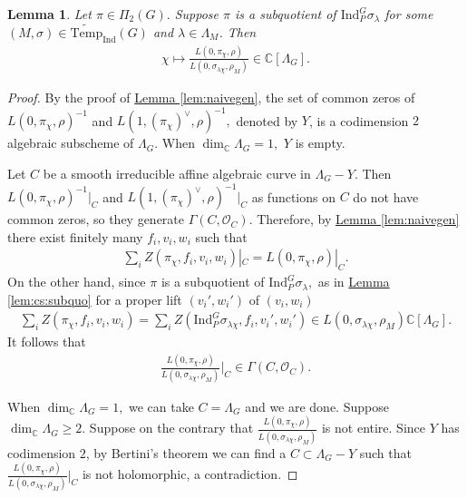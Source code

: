 \documentclass[10pt]{amsart}
\newtheorem{lemma}[theorem]{Lemma}
\theoremstyle{definition}
\numberwithin{equation}{section}
\numberwithin{equation}{subsection}
\newcommand{\Ind}{\mathrm{Ind}}
\newcommand{\CC}{\mathbb{C}}
\newcommand{\Temp}{\mathrm{Temp}}
\begin{document}
\begin{lemma}\label{lem:divides}
    Let $\pi\in \Pi_2(G).$ Suppose $\pi$ is a subquotient of $\mathrm{Ind}_P^G\sigma_\lambda$ for some $(M,\sigma)\in\widetilde{\Temp}_{\Ind}(G)$ and $\lambda\in \Lambda_M$. Then 
    \begin{align*}
        \chi\mapsto \frac{L(0,\pi_\chi,\rho)}{L(0,\sigma_{\lambda\chi},\rho_M)}\in \CC[\Lambda_G].
    \end{align*}
\end{lemma}

\begin{proof}
By the proof of \hyperref[lem:naivegen]{Lemma \ref{lem:naivegen}}, the set of common zeros of $L(0,\pi_\chi,\rho)^{-1}$ and  $L(1,(\pi_{\chi})^\lor,\rho)^{-1},$ denoted by $Y$, is a codimension $2$ algebraic subscheme of $\Lambda_G$. When $\dim_\CC\Lambda_G=1,$ $Y$ is empty. 

    
    Let $C$ be a smooth irreducible affine algebraic curve in $\Lambda_G-Y$. Then $L(0,\pi_{\chi},\rho)^{-1}|_C$ and $L(1,(\pi_{\chi})^\lor,\rho)^{-1}|_C$ as functions on $C$ do not have common zeros, so they generate $\Gamma(C,\mathcal{O}_C).$ Therefore, by \hyperref[lem:naivegen]{Lemma \ref{lem:naivegen}} there exist finitely many $f_i,v_i,w_i$ such that
    \begin{align*}
\sum_{i}Z(\pi_{\chi},f_i,v_i,w_i)|_C=L(0,\pi_{\chi},\rho)|_C.
    \end{align*}
    On the other hand, since $\pi$ is a subquotient of $\mathrm{Ind}_P^G\sigma_\lambda,$ as in \hyperref[lem:cs:subquo]{Lemma \ref{lem:cs:subquo}} for a proper lift $(v_i',w_i')$ of $(v_i,w_i)$
    \begin{align*}
        \sum_{i}Z(\pi_{\chi},f_i,v_i,w_i)=\sum_{i}Z(\mathrm{Ind}_P^G \sigma_{\lambda\chi},f_i,v_i',w_i')\in L(0,\sigma_{\lambda\chi},\rho_M)\CC[\Lambda_G].
    \end{align*}
   It follows that
    \begin{align*}
        \frac{L(0,\pi_\chi,\rho)}{L(0,\sigma_{\lambda\chi},\rho_M)}\bigg|_C\in \Gamma(C,\mathcal{O}_C).
    \end{align*}

    When $\dim_\CC \Lambda_G=1,$ we can take $C=\Lambda_G$ and we are done. Suppose $\dim_\CC \Lambda_G\ge 2.$ Suppose on the contrary that $\tfrac{L(0,\pi_\chi,\rho)}{L(0,\sigma_{\lambda\chi},\rho_M)}$ is not entire. Since $Y$ has codimension $2$, by Bertini's theorem \cite[Theorem 6.3, Remark 6.3.18]{Jean-Pierre:Bertini} we can find a $C\subset \Lambda_G-Y$ such that $\tfrac{L(0,\pi_\chi,\rho)}{L(0,\sigma_{\lambda\chi},\rho_M)}\big|_C$ is not holomorphic, a contradiction.
\end{proof}
\end{document}
